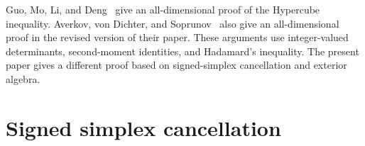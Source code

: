 \documentclass[11pt]{article}
\theoremstyle{remark}
\newcommand{\R}{\mathbb{R}}
\newcommand{\vol}{\operatorname{vol}}
\newcommand{\conv}{\operatorname{conv}}
\newcommand{\sgn}{\operatorname{sgn}}
\newcommand{\one}{1}
\begin{document}
\begin{humanblock}
Guo, Mo, Li, and Deng~\cite[Section 5.2 and Appendix J.1]{EPOCH} give an all-dimensional proof of the Hypercube inequality. Averkov, von Dichter, and Soprunov~\cite[Section 7]{AVS} also give an all-dimensional proof in the revised version of their paper. These arguments use integer-valued determinants, second-moment identities, and Hadamard's inequality. The present paper gives a different proof based on signed-simplex cancellation and exterior algebra.





\end{humanblock}

\section{Signed simplex cancellation}
\label{sec:cocycle}
\end{document}
